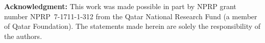 \documentclass[runningheads]{llncs}
\begin{document}
\smallskip
\noindent\textbf{Acknowledgment:} This work was made possible in part by NPRP grant number NPRP~7-1711-1-312 from the Qatar National Research Fund (a member of Qatar Foundation). The statements made herein are solely the responsibility of the authors.



\end{document}

